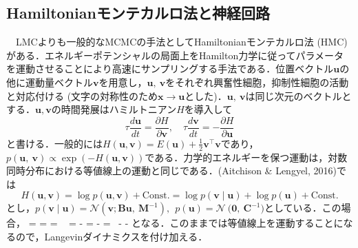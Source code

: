 \subsection{Hamiltonianモンテカルロ法と神経回路}
　LMCよりも一般的なMCMCの手法としてHamiltonianモンテカルロ法 (HMC)がある．エネルギーポテンシャルの局面上をHamilton力学に従ってパラメータを運動させることにより高速にサンプリングする手法である．位置ベクトル$\mathbf{u}$の他に運動量ベクトル$\mathbf{v}$を用意し，$\mathbf{u}\mathbf{,\ }\mathbf{v}$をそれぞれ興奮性細胞，抑制性細胞の活動と対応付ける (文字の対称性のため$\mathbf{x}\to \mathbf{u}$とした)．$\mathbf{u,\ v}$は同じ次元のベクトルとする．$\mathbf{u}, \mathbf{v}$の時間発展はハミルトニアン$H$を導入して
\begin{equation}
\tau\frac{d\mathbf{u}}{dt} = \frac{\partial H}{\partial\mathbf{v}},\quad\tau\frac{d\mathbf{v}}{dt} = - \frac{\partial H}{\partial\mathbf{u}}
\end{equation}
と書ける．一般的には$H(\mathbf{u}, \mathbf{v}) = E\left( \mathbf{u} \right) + \frac{1}{2}\mathbf{v}^{\top}\mathbf{v}$であり，$p\left( \mathbf{u},\ \mathbf{v} \right) \propto \exp( - H(\mathbf{u,v}))$である．力学的エネルギーを保つ運動は，対数同時分布における等値線上の運動と同じである．(Aitchison & Lengyel, 2016)では
\begin{equation}
H(\mathbf{u}, \mathbf{v}) = \log p \left(\mathbf{u}, \mathbf{v} \right) + \textrm{Const.} = \log p \left(\mathbf{v} \middle| \mathbf{u} \right) + \log p\left(\mathbf{u} \right) + \textrm{Const.}
\end{equation}
とし，$p\left( \mathbf{v} \middle| \mathbf{u} \right)\mathcal{= N}\left( \mathbf{v};\mathbf{Bu},\ \mathbf{M}^{- 1} \right),\ \ p\left( \mathbf{u} \right) = \mathcal{N\ (}\mathbf{0},\ \mathbf{C}^{- 1})$としている．この場合，
{ =  =  = \ 
}{ = -  = -  = \  -  - 
}となる．このままでは等値線上を運動することになるので，Langevinダイナミクスを付け加える．

